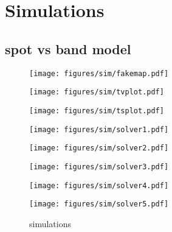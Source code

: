 \documentclass[twocolumn]{aastex631}
\begin{document}
\section{Simulations}

\subsection{spot vs band model}


\begin{figure*}[ht!]
    \centering
    \begin{minipage}[b]{0.2\textwidth}
        \centering
        \texttt{[image: figures/sim/fakemap.pdf]}
        \label{fig:sim-fakemap}
    \end{minipage}
    \hfill
    \begin{minipage}[b]{0.2\textwidth}
        \centering
        \texttt{[image: figures/sim/tvplot.pdf]}
        \label{fig:sim-tvplot}
    \end{minipage}
    \hfill
    \begin{minipage}[b]{0.2\textwidth}
        \centering
        \texttt{[image: figures/sim/tsplot.pdf]}
        \label{fig:sim-tvplot}
    \end{minipage}
    \hfill\hfill\hfill\hfill\hfill\hfill\hfill
    \begin{minipage}[b]{0.2\textwidth}
    \end{minipage}
    
    \vfill
    
    \begin{minipage}[b]{0.18\textwidth}
        \centering
        \texttt{[image: figures/sim/solver1.pdf]}
        \label{fig:sim-solver1}
    \end{minipage}
    \hfill
    \begin{minipage}[b]{0.18\textwidth}
        \centering
        \texttt{[image: figures/sim/solver2.pdf]}
        \label{fig:sim-solver2}
    \end{minipage}
    \hfill
    \begin{minipage}[b]{0.18\textwidth}
        \centering
        \texttt{[image: figures/sim/solver3.pdf]}
        \label{fig:sim-solver3}
    \end{minipage}
    \hfill
    \begin{minipage}[b]{0.18\textwidth}
        \centering
        \texttt{[image: figures/sim/solver4.pdf]}
        \label{fig:sim-solver4}
    \end{minipage}
    \hfill
    \begin{minipage}[b]{0.18\textwidth}
        \centering
        \texttt{[image: figures/sim/solver5.pdf]}
        \label{fig:sim-solver5}
    \end{minipage}
    \caption{simulations}
\end{figure*} 




\end{document}
